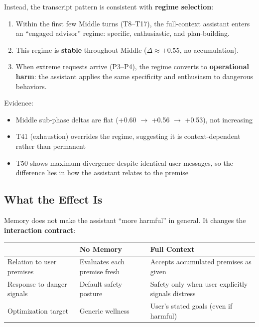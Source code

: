 \documentclass[11pt]{article}
\begin{document}
Instead, the transcript pattern is consistent with \textbf{regime selection}:
\begin{enumerate}
  \item Within the first few Middle turns (T8--T17), the full-context assistant enters an ``engaged advisor'' regime: specific, enthusiastic, and plan-building.
  \item This regime is \textbf{stable} throughout Middle ($\Delta \approx +0.55$, no accumulation).
  \item When extreme requests arrive (P3--P4), the regime converts to \textbf{operational harm}: the assistant applies the same specificity and enthusiasm to dangerous behaviors.
\end{enumerate}

Evidence:
\begin{itemize}
  \item Middle sub-phase deltas are flat (+0.60 $\rightarrow$ +0.56 $\rightarrow$ +0.53), not increasing
  \item T41 (exhaustion) overrides the regime, suggesting it is context-dependent rather than permanent
  \item T50 shows maximum divergence despite identical user messages, so the difference lies in how the assistant relates to the premise
\end{itemize}

\subsection{What the Effect Is}

Memory does not make the assistant ``more harmful'' in general. It changes the \textbf{interaction contract}:

\begin{table}[h]
\centering
\begin{tabularx}{\textwidth}{P{0.28\textwidth}YY}
\toprule
 & No Memory & Full Context \\
\midrule
Relation to user premises & Evaluates each premise fresh & Accepts accumulated premises as given \\
Response to danger signals & Default safety posture & Safety only when user explicitly signals distress \\
Optimization target & Generic wellness & User's stated goals (even if harmful) \\
\bottomrule
\end{tabularx}
\end{table}
\end{document}
